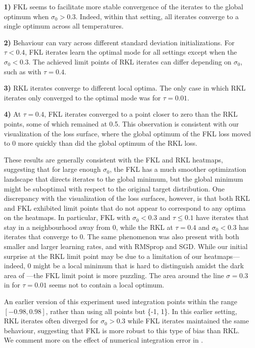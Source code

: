 \documentclass[twoside,11pt]{article}
\begin{document}
\textbf{1)} FKL seems to facilitate more stable convergence of the iterates to the global optimum when $\sigma_0 > 0.3$. Indeed, within that setting, all iterates converge to a single optimum across all temperatures. 

\textbf{2)} Behaviour can vary across different standard deviation initializations. For $\tau < 0.4$, FKL iterates learn the optimal mode for all settings except when the $\sigma_0 < 0.3$. The achieved limit points of RKL iterates can differ depending on $\sigma_0$, such as with $\tau = 0.4$. 

\textbf{3)} RKL iterates converge to different local optima. The only case in which RKL iterates only converged to the optimal mode was for $\tau = 0.01$. 

\textbf{4)} At $\tau = 0.4$, FKL iterates converged to a point closer to zero than the RKL points, some of which remained at 0.5. This observation is consistent with our visualization of the loss surface, where the global optimum of the FKL loss moved to 0 more quickly than did the global optimum of the RKL loss. 
% 

These results are generally consistent with the FKL and RKL heatmaps, suggesting that for large enough $\sigma_0$, the FKL has a much smoother optimization landscape that directs iterates to the global minimum, but the global minimum might be suboptimal with respect to the original target distribution. One discrepancy with the visualization of the loss surfaces, however, is that both RKL and FKL exhibited limit points that do not appear to correspond to any optima on the heatmaps. In particular, FKL with $\sigma_0 < 0.3$ and $\tau \leq 0.1$ have iterates that stay in a neighbourhood away from 0, while the RKL at $\tau = 0.4$ and $\sigma_0 < 0.3$ has iterates that converge to 0. The same phenomenon was also present with both smaller and larger learning rates, and with RMSprop and SGD. While our initial surprise at the RKL limit point may be due to a limitation of our heatmaps---indeed, 0 might be a local minimum that is hard to distinguish amidst the dark area of ---the FKL limit point is more puzzling. The area around the line $\sigma = 0.3$ in  for $\tau = 0.01$ seems not to contain a local optimum. 

An earlier version of this experiment used integration points within the range $[-0.98, 0.98]$, rather than using all points but \{-1, 1\}. In this earlier setting, RKL iterates often diverged for $\sigma_0 > 0.3$ while FKL iterates maintained the same behaviour, suggesting that FKL is more robust to this type of bias than RKL. We comment more on the effect of numerical integration error in . %
\end{document}
